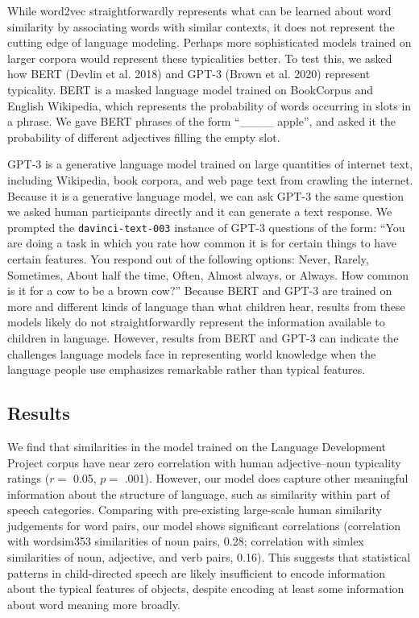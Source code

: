 \documentclass{ucetd}
\begin{document}
While word2vec straightforwardly represents what can be learned about
word similarity by associating words with similar contexts, it does not
represent the cutting edge of language modeling. Perhaps more
sophisticated models trained on larger corpora would represent these
typicalities better. To test this, we asked how BERT (Devlin et al.
2018) and GPT-3 (Brown et al. 2020) represent typicality. BERT is a
masked language model trained on BookCorpus and English Wikipedia, which
represents the probability of words occurring in slots in a phrase. We
gave BERT phrases of the form ``\_\_\_\_ apple'', and asked it the
probability of different adjectives filling the empty slot.

GPT-3 is a generative language model trained on large quantities of
internet text, including Wikipedia, book corpora, and web page text from
crawling the internet. Because it is a generative language model, we can
ask GPT-3 the same question we asked human participants directly and it
can generate a text response. We prompted the \texttt{davinci-text-003}
instance of GPT-3 questions of the form: ``You are doing a task in which
you rate how common it is for certain things to have certain features.
You respond out of the following options: Never, Rarely, Sometimes,
About half the time, Often, Almost always, or Always. How common is it
for a cow to be a brown cow?'' Because BERT and GPT-3 are trained on
more and different kinds of language than what children hear, results
from these models likely do not straightforwardly represent the
information available to children in language. However, results from
BERT and GPT-3 can indicate the challenges language models face in
representing world knowledge when the language people use emphasizes
remarkable rather than typical features.

\hypertarget{results-1}{%
\subsection{Results}\label{results-1}}

We find that similarities in the model trained on the Language
Development Project corpus have near zero correlation with human
adjective--noun typicality ratings (\(r =\) 0.05, \(p =\) .001).
However, our model does capture other meaningful information about the
structure of language, such as similarity within part of speech
categories. Comparing with pre-existing large-scale human similarity
judgements for word pairs, our model shows significant correlations
(correlation with wordsim353 similarities of noun pairs, 0.28;
correlation with simlex similarities of noun, adjective, and verb pairs,
0.16). This suggests that statistical patterns in child-directed speech
are likely insufficient to encode information about the typical features
of objects, despite encoding at least some information about word
meaning more broadly.
\end{document}
